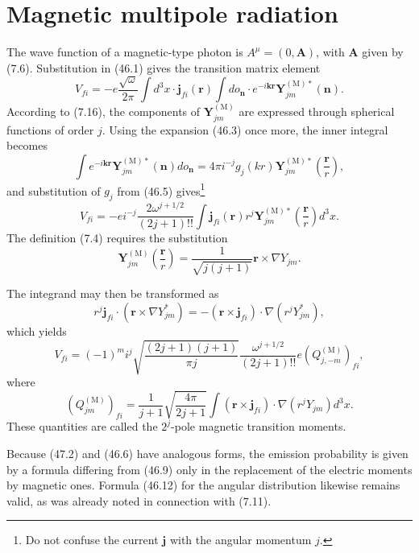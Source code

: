 \section{Magnetic multipole radiation}

The wave function of a magnetic-type photon is $A^\mu=(0,\mathbf A)$, with $\mathbf A$ given by (7.6). Substitution in (46.1) gives the transition matrix element
\begin{equation}
V_{fi}=-e\frac{\sqrt\omega}{2\pi}\int d^3x\cdot\mathbf j_{fi}(\mathbf r)
\int do_{\mathbf n}\cdot e^{-i\mathbf k\mathbf r}\mathbf Y_{jm}^{(\mathrm M)*}(\mathbf n).
\tag{47.1}
\end{equation}
According to (7.16), the components of $\mathbf Y_{jm}^{(\mathrm M)}$ are expressed through spherical functions of order $j$. Using the expansion (46.3) once more, the inner integral becomes
\[
\int e^{-i\mathbf k\mathbf r}\mathbf Y_{jm}^{(\mathrm M)*}(\mathbf n)do_{\mathbf n}
=4\pi i^{-j}g_j(kr)\mathbf Y_{jm}^{(\mathrm M)*}\left(\frac{\mathbf r}{r}\right),
\]
and substitution of $g_j$ from (46.5) gives\footnote{Do not confuse the current $\mathbf j$ with the angular momentum $j$.}
\[
V_{fi}=-ei^{-j}\frac{2\omega^{j+1/2}}{(2j+1)!!}
\int\mathbf j_{fi}(\mathbf r)r^j\mathbf Y_{jm}^{(\mathrm M)*}
\left(\frac{\mathbf r}{r}\right)d^3x.
\]
The definition (7.4) requires the substitution
\[
\mathbf Y_{jm}^{(\mathrm M)}\left(\frac{\mathbf r}{r}\right)
=\frac1{\sqrt{j(j+1)}}\mathbf r\times\nabla Y_{jm}.
\]

The integrand may then be transformed as
\[
r^j\mathbf j_{fi}\cdot(\mathbf r\times\nabla Y_{jm}^*)
=-(\mathbf r\times\mathbf j_{fi})\cdot\nabla(r^jY_{jm}^*),
\]
which yields
\begin{equation}
V_{fi}=(-1)^m i^j\sqrt{\frac{(2j+1)(j+1)}{\pi j}}
\frac{\omega^{j+1/2}}{(2j+1)!!}e(Q_{j,-m}^{(\mathrm M)})_{fi},
\tag{47.2}
\end{equation}
where
\begin{equation}
(Q_{jm}^{(\mathrm M)})_{fi}=\frac1{j+1}\sqrt{\frac{4\pi}{2j+1}}
\int(\mathbf r\times\mathbf j_{fi})\cdot\nabla(r^jY_{jm})d^3x.
\tag{47.3}
\end{equation}
These quantities are called the $2^j$-pole magnetic transition moments.

Because (47.2) and (46.6) have analogous forms, the emission probability is given by a formula differing from (46.9) only in the replacement of the electric moments by magnetic ones. Formula (46.12) for the angular distribution likewise remains valid, as was already noted in connection with (7.11).

